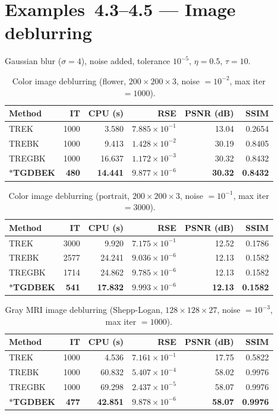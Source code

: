 \documentclass[11pt,a4paper]{article}
\begin{document}
\section*{Examples~4.3--4.5 — Image deblurring}
Gaussian blur ($\sigma=4$), noise added, tolerance $10^{-5}$, $\eta=0.5$, $\tau=10$.

\begin{table}[ht]
\centering
\caption{Color image deblurring (flower, $200\times 200\times 3$, noise $=10^{-2}$, max iter $=1000$).}
\label{tab:flower}
\begin{tabular}{lrrrrr}
\toprule
Method & IT & CPU (s) & RSE & PSNR (dB) & SSIM \\
\midrule
TREK & 1000 & 3.580 & $7.885\times 10^{-1}$ & 13.04 & 0.2654 \\
TREBK & 1000 & 9.413 & $1.428\times 10^{-2}$ & 30.19 & 0.8405 \\
TREGBK & 1000 & 16.637 & $1.172\times 10^{-3}$ & 30.32 & 0.8432 \\
$*$\textbf{TGDBEK} & \textbf{480} & \textbf{14.441} & \textbf{$9.877\times 10^{-6}$} & \textbf{30.32} & \textbf{0.8432} \\
\bottomrule
\end{tabular}
\end{table}

\begin{table}[ht]
\centering
\caption{Color image deblurring (portrait, $200\times 200\times 3$, noise $=10^{-1}$, max iter $=3000$).}
\label{tab:original}
\begin{tabular}{lrrrrr}
\toprule
Method & IT & CPU (s) & RSE & PSNR (dB) & SSIM \\
\midrule
TREK & 3000 & 9.920 & $7.175\times 10^{-1}$ & 12.52 & 0.1786 \\
TREBK & 2577 & 24.241 & $9.036\times 10^{-6}$ & 12.13 & 0.1582 \\
TREGBK & 1714 & 24.862 & $9.785\times 10^{-6}$ & 12.13 & 0.1582 \\
$*$\textbf{TGDBEK} & \textbf{541} & \textbf{17.832} & \textbf{$9.993\times 10^{-6}$} & \textbf{12.13} & \textbf{0.1582} \\
\bottomrule
\end{tabular}
\end{table}

\begin{table}[ht]
\centering
\caption{Gray MRI image deblurring (Shepp-Logan, $128\times 128\times 27$, noise $=10^{-3}$, max iter $=1000$).}
\label{tab:shepp}
\begin{tabular}{lrrrrr}
\toprule
Method & IT & CPU (s) & RSE & PSNR (dB) & SSIM \\
\midrule
TREK & 1000 & 4.536 & $7.161\times 10^{-1}$ & 17.75 & 0.5822 \\
TREBK & 1000 & 60.832 & $5.407\times 10^{-4}$ & 58.02 & 0.9976 \\
TREGBK & 1000 & 69.298 & $2.437\times 10^{-5}$ & 58.07 & 0.9976 \\
$*$\textbf{TGDBEK} & \textbf{477} & \textbf{42.851} & \textbf{$9.878\times 10^{-6}$} & \textbf{58.07} & \textbf{0.9976} \\
\bottomrule
\end{tabular}
\end{table}
\end{document}
